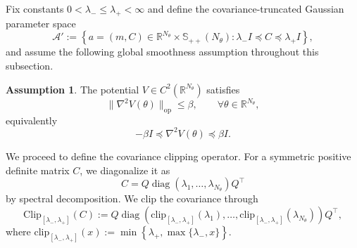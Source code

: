 \documentclass[11pt]{article}
\theoremstyle{plain}
\theoremstyle{definition}
\newtheorem{assumption}[theorem]{Assumption}
\theoremstyle{remark}
\newcommand{\R}{\mathbb{R}}
\newcommand{\E}{\mathbb{E}}
\newcommand{\diag}{\operatorname{diag}}
\newcommand{\SPD}{\mathbb{S}_{++}}
\newcommand{\post}{\mathrm{post}}
\newcommand{\Clip}{\mathrm{Clip}}
\newcommand{\clip}{\mathrm{clip}}
\newcommand{\Aspace}{\mathcal{A}}
\begin{document}
Fix constants $0 < \lambda_- \leq \lambda_+ < \infty$ and define the covariance-truncated Gaussian parameter space
\begin{equation*}
    \Aspace' := \left\{ a = (m, C) \in \R^{N_\theta} \times \SPD (N_\theta) : \lambda_- I \preceq C \preceq \lambda_+ I \right\},
\end{equation*}
and assume the following global smoothness assumption throughout this subsection.

\begin{assumption}\label{assump:smooth}
    The potential $V \in C^2 (\R^{N_\theta})$ satisfies
    \begin{equation*}
        \| \nabla^2 V(\theta) \|_\mathrm{op} \leq \beta, \qquad \forall \theta\in \R^{N_\theta},
    \end{equation*}
    equivalently
    \begin{equation*}
        -\beta I \preceq \nabla^2 V(\theta) \preceq \beta I.
    \end{equation*}
\end{assumption}

We proceed to define the covariance clipping operator. For a symmetric positive definite matrix $C$, we diagonalize it as
\begin{equation*}
    C = Q \diag (\lambda_1, \ldots, \lambda_{N_\theta}) Q^\top
\end{equation*}
by spectral decomposition. We clip the covariance through
\begin{equation*}
    \Clip_{[\lambda_-, \lambda_+]} (C) := Q \diag \left( \clip_{[\lambda_-, \lambda_+]} (\lambda_1), \ldots, \clip_{[\lambda_-, \lambda_+]} (\lambda_{N_\theta}) \right) Q^\top,
\end{equation*}
where $\clip_{[\lambda_-, \lambda_+]} (x) := \min \left\{ \lambda_+, \max \{\lambda_-, x\} \right\}$.

\end{document}
